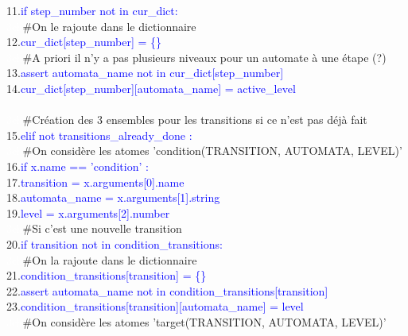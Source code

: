 \documentclass[12pt,a4paper]{article}
\begin{document}
{			11.\qquad\qquad\qquad\textcolor{blue}{if step\_number not in cur\_dict:}\\
				\textcolor{white}{3ch}\qquad\qquad\qquad\qquad\#On le rajoute dans le dictionnaire\\
				12.\qquad\qquad\qquad\qquad\textcolor{blue}{cur\_dict[step\_number] = \{\}}\\
			\textcolor{white}{3ch}\qquad\qquad\qquad\#A priori il n'y a pas plusieurs niveaux pour un automate à une étape (?)\\
			13.\qquad\qquad\qquad\textcolor{blue}{assert automata\_name not in cur\_dict[step\_number]}\\
			14.\qquad\qquad\qquad\textcolor{blue}{cur\_dict[step\_number][automata\_name] = active\_level}\\ \\
		\textcolor{white}{3ch}\qquad\qquad\#Création des 3 ensembles pour les transitions si ce n'est pas déjà fait\\
		15.\qquad\qquad\textcolor{blue}{elif not transitions\_already\_done :}\\
			\textcolor{white}{3ch}\qquad\qquad\qquad\#On considère les atomes 'condition(TRANSITION, AUTOMATA, LEVEL)'\\
			16.\qquad\qquad\qquad\textcolor{blue}{if x.name == 'condition' :}\\
				17.\qquad\qquad\qquad\qquad\textcolor{blue}{transition = x.arguments[0].name}\\
				18.\qquad\qquad\qquad\qquad\textcolor{blue}{automata\_name = x.arguments[1].string}\\
				19.\qquad\qquad\qquad\qquad\textcolor{blue}{level = x.arguments[2].number}\\
				\textcolor{white}{3ch}\qquad\qquad\qquad\qquad\#Si c'est une nouvelle transition\\
				20.\qquad\qquad\qquad\qquad\textcolor{blue}{if transition not in condition\_transitions:}\\
					\textcolor{white}{3ch}\qquad\qquad\qquad\qquad\qquad\#On la rajoute dans le dictionnaire\\
					21.\qquad\qquad\qquad\qquad\qquad\textcolor{blue}{condition\_transitions[transition] = \{\}}\\
				22.\qquad\qquad\qquad\qquad\textcolor{blue}{assert automata\_name not in condition\_transitions[transition]}\\
				23.\qquad\qquad\qquad\qquad\textcolor{blue}{condition\_transitions[transition][automata\_name] = level}\\
			\textcolor{white}{3ch}\qquad\qquad\qquad\#On considère les atomes 'target(TRANSITION, AUTOMATA, LEVEL)'\\
}
\end{document}
